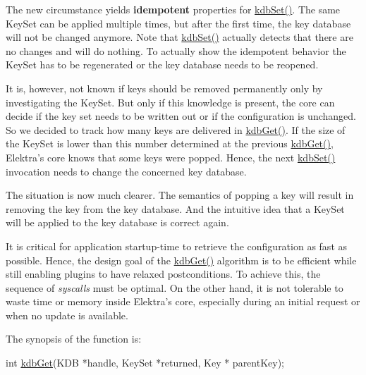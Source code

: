 The new circumstance yields {\bfseries idempotent} properties for {\ttfamily \hyperlink{group__kdb_ga11436b058408f83d303ca5e996832bcf}{kdb\+Set()}}. The same {\ttfamily Key\+Set} can be applied multiple times, but after the first time, the key database will not be changed anymore. Note that {\ttfamily \hyperlink{group__kdb_ga11436b058408f83d303ca5e996832bcf}{kdb\+Set()}} actually detects that there are no changes and will do nothing. To actually show the idempotent behavior the Key\+Set has to be regenerated or the key database needs to be reopened.

It is, however, not known if keys should be removed permanently only by investigating the {\ttfamily Key\+Set}. But only if this knowledge is present, the core can decide if the key set needs to be written out or if the configuration is unchanged. So we decided to track how many keys are delivered in {\ttfamily \hyperlink{group__kdb_ga28e385fd9cb7ccfe0b2f1ed2f62453a1}{kdb\+Get()}}. If the size of the {\ttfamily Key\+Set} is lower than this number determined at the previous {\ttfamily \hyperlink{group__kdb_ga28e385fd9cb7ccfe0b2f1ed2f62453a1}{kdb\+Get()}}, Elektra’s core knows that some keys were popped. Hence, the next {\ttfamily \hyperlink{group__kdb_ga11436b058408f83d303ca5e996832bcf}{kdb\+Set()}} invocation needs to change the concerned key database.

The situation is now much clearer. The semantics of popping a key will result in removing the key from the key database. And the intuitive idea that a {\ttfamily Key\+Set} will be applied to the key database is correct again.

It is critical for application startup-\/time to retrieve the configuration as fast as possible. Hence, the design goal of the {\ttfamily \hyperlink{group__kdb_ga28e385fd9cb7ccfe0b2f1ed2f62453a1}{kdb\+Get()}} algorithm is to be efficient while still enabling plugins to have relaxed postconditions. To achieve this, the sequence of {\itshape syscalls} must be optimal. On the other hand, it is not tolerable to waste time or memory inside Elektra’s core, especially during an initial request or when no update is available.

The synopsis of the function is\+:


\begin{DoxyCode}
\textcolor{keywordtype}{int} \hyperlink{group__kdb_ga28e385fd9cb7ccfe0b2f1ed2f62453a1}{kdbGet}(KDB *handle, KeySet *returned, Key * parentKey);
\end{DoxyCode}


